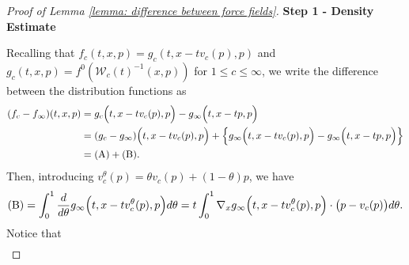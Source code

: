 \documentclass[reqno, 11pt, letterpaper]{amsart}
\theoremstyle{remark}
\numberwithin{equation}{section}
\numberwithin{theorem}{section}
\numberwithin{table}{section}
\numberwithin{figure}{section}
\begin{document}
\begin{proof}[Proof of Lemma \ref{lemma: difference between force fields}]
\textbf{Step 1 - Density Estimate}

\noindent Recalling that $f_c(t,x,p)=g_c(t,x-tv_c(p),p)$ and 
$g_c(t,x,p)=f^0(\mathcal{W}_c(t)^{-1}(x,p))$ for $1\leq c\leq\infty$, we write the difference between the distribution functions as 
$$\begin{aligned}
(f_c-f_\infty)(t,x,p)&=g_c\Big(t,x-tv_c(p),p\Big)-g_\infty\Big(t,x-tp,p\Big)\\
&=(g_c-g_\infty)\Big(t,x-tv_c(p),p\Big)+\Big\{g_\infty\Big(t,x-tv_c(p),p\Big)-g_\infty\Big(t,x-tp,p\Big)\Big\}\\
&=\textup{(A)}+\textup{(B)}.
\end{aligned}$$
Then, introducing $v_c^\theta(p)=\theta v_c(p)+(1-\theta)p$, we have 
$$\textup{(B)}=\int_0^1 \frac{d}{d\theta}g_\infty\Big(t,x-tv_c^\theta(p),p\Big)d\theta=t\int_0^1 \nabla_xg_\infty\Big(t,x-tv_c^\theta(p),p\Big)\cdot\big(p-v_c(p)\big)d\theta.$$
Notice that
$$\begin{aligned}

\end{aligned}$$
\end{proof}
\end{document}
